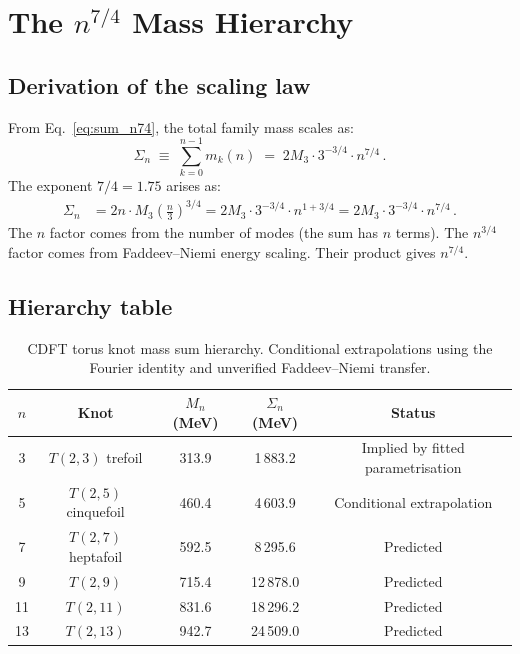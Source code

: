 \documentclass[11pt]{article}
\begin{document}
\section{The $n^{7/4}$ Mass Hierarchy}
\label{sec:hierarchy}

\subsection{Derivation of the scaling law}

From Eq.~\eqref{eq:sum_n74}, the total family mass scales as:
\begin{equation}
  \Sigma_n \;\equiv\; \sum_{k=0}^{n-1} m_k(n) \;=\; 2M_3 \cdot 3^{-3/4} \cdot n^{7/4}\,.
  \label{eq:n74}
\end{equation}
The exponent $7/4 = 1.75$ arises as:
\begin{align*}
  \Sigma_n &= 2n \cdot M_3 \left(\frac{n}{3}\right)^{3/4}
  = 2M_3 \cdot 3^{-3/4} \cdot n^{1+3/4}
  = 2M_3 \cdot 3^{-3/4} \cdot n^{7/4}\,.
\end{align*}
The $n$ factor comes from the number of modes (the sum has $n$ terms).
The $n^{3/4}$ factor comes from Faddeev--Niemi energy scaling.
Their product gives $n^{7/4}$.

\subsection{Hierarchy table}

\begin{table}[h]
  \caption{CDFT torus knot mass sum hierarchy.
    Conditional extrapolations using the Fourier identity and unverified
    Faddeev--Niemi transfer.}
  \label{tab:hierarchy}
  \begin{tabular}{ccccc}
    \toprule
    $n$ & Knot & $M_n$ (MeV) & $\Sigma_n$ (MeV) & Status \\
    \midrule
    3  & $T(2,3)$ trefoil    & 313.9  & 1\,883.2  & Implied by fitted parametrisation \\
    5  & $T(2,5)$ cinquefoil & 460.4  & 4\,603.9  & Conditional extrapolation \\
    7  & $T(2,7)$ heptafoil  & 592.5  & 8\,295.6  & Predicted \\
    9  & $T(2,9)$            & 715.4  & 12\,878.0 & Predicted \\
    11 & $T(2,11)$           & 831.6  & 18\,296.2 & Predicted \\
    13 & $T(2,13)$           & 942.7  & 24\,509.0 & Predicted \\
    \bottomrule
  \end{tabular}
\end{table}
\end{document}
